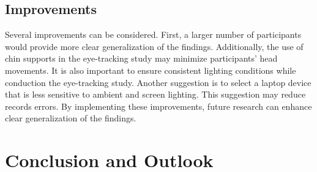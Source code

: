 \section{Improvements}

Several improvements can be considered. First, a larger number of participants would provide more clear generalization of the findings. Additionally, the use of chin supports in the eye-tracking study may minimize participants’ head movements. It is also important to ensure consistent lighting conditions while conduction the eye-tracking study. Another suggestion is to select a laptop device that is less sensitive to ambient and screen lighting. This suggestion may reduce records errors. By implementing these improvements, future research can enhance clear generalization of the findings. 

\chapter{Conclusion and Outlook}
\label{sec:conclusion}
